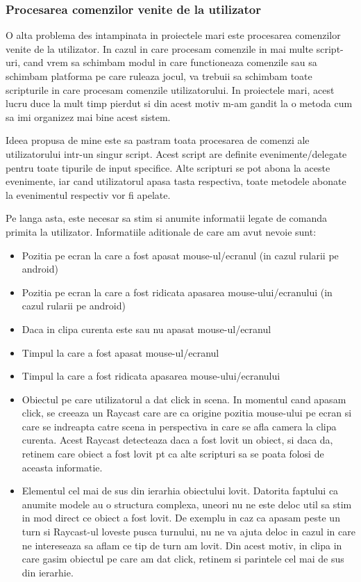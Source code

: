 \documentclass[12pt, a4paper]{article}
\begin{document}
	
	
	
	
	\subsubsection{Procesarea comenzilor venite de la utilizator}
	
	O alta problema des intampinata in proiectele mari este procesarea comenzilor venite de la utilizator. In cazul in care procesam comenzile in mai multe script-uri, cand vrem sa schimbam modul in care functioneaza comenzile sau sa schimbam platforma pe care ruleaza jocul, va trebuii sa schimbam toate scripturile in care procesam comenzile utilizatorului. In proiectele mari, acest lucru duce la mult timp pierdut si din acest motiv m-am gandit la o metoda cum sa imi organizez mai bine acest sistem.
	\newline
	
	Ideea propusa de mine este sa pastram toata procesarea de comenzi ale utilizatorului intr-un singur script. Acest script are definite evenimente/delegate pentru toate tipurile de input specifice. Alte scripturi se pot abona la aceste evenimente, iar cand utilizatorul apasa tasta respectiva, toate metodele abonate la evenimentul respectiv vor fi apelate.
	\newline
	
	Pe langa asta, este necesar sa stim si anumite informatii legate de comanda primita la utilizator. Informatiile aditionale de care am avut nevoie sunt:
	
	\begin{itemize}
		\item Pozitia pe ecran la care a fost apasat mouse-ul/ecranul (in cazul rularii pe android)
		\item Pozitia pe ecran la care a fost ridicata apasarea mouse-ului/ecranului (in cazul rularii pe android)
		\item Daca in clipa curenta este sau nu apasat mouse-ul/ecranul
		\item Timpul la care a fost apasat mouse-ul/ecranul
		\item Timpul la care a fost ridicata apasarea mouse-ului/ecranului
		\item Obiectul pe care utilizatorul a dat click in scena. In momentul cand apasam click, se creeaza un Raycast care are ca origine pozitia mouse-ului pe ecran si care se indreapta catre scena in perspectiva in care se afla camera la clipa curenta. Acest Raycast detecteaza daca a fost lovit un obiect, si daca da, retinem care obiect a fost lovit pt ca alte scripturi sa se poata folosi de aceasta informatie.
		\item Elementul cel mai de sus din ierarhia obiectului lovit. Datorita faptului ca anumite modele au o structura complexa, uneori nu ne este deloc util sa stim in mod direct ce obiect a fost lovit. De exemplu in caz ca apasam peste un turn si Raycast-ul loveste pusca turnului, nu ne va ajuta deloc in cazul in care ne intereseaza sa aflam ce tip de turn am lovit. Din acest motiv, in clipa in care gasim obiectul pe care am dat click, retinem si parintele cel mai de sus din ierarhie.
	\end{itemize}
\end{document}
